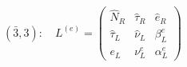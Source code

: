 \begin{equation}
(\bar{3},3): \quad L^{(e)}= \left( \begin{array}{ccc}
\hat{N}_R  & \hat{\tau}_R & \hat{e}_R  \\
\hat{\tau}_L & \hat{\nu}_L & \beta_L^e \\
e_L & \nu_L^e & \alpha_L^e
\end{array} \right)  \label{3.2.8}
\end{equation}

